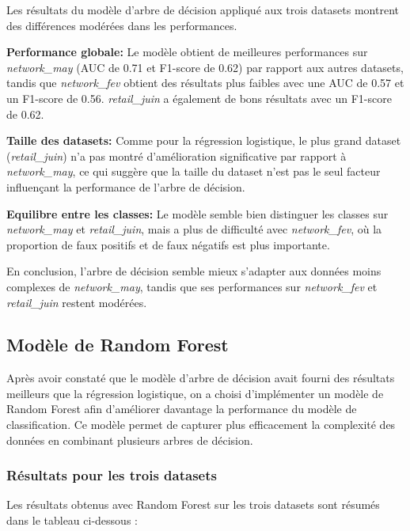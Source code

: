 Les résultats du modèle d'arbre de décision appliqué aux trois datasets montrent des différences modérées dans les performances.

\textbf{Performance globale:} Le modèle obtient de meilleures performances sur \textit{network\_may} (AUC de 0.71 et F1-score de 0.62) par rapport aux autres datasets, tandis que \textit{network\_fev} obtient des résultats plus faibles avec une AUC de 0.57 et un F1-score de 0.56. \textit{retail\_juin} a également de bons résultats avec un F1-score de 0.62.

\textbf{Taille des datasets:} Comme pour la régression logistique, le plus grand dataset (\textit{retail\_juin}) n'a pas montré d'amélioration significative par rapport à \textit{network\_may}, ce qui suggère que la taille du dataset n'est pas le seul facteur influençant la performance de l'arbre de décision.

\textbf{Equilibre entre les classes:} Le modèle semble bien distinguer les classes sur \textit{network\_may} et \textit{retail\_juin}, mais a plus de difficulté avec \textit{network\_fev}, où la proportion de faux positifs et de faux négatifs est plus importante.

En conclusion, l'arbre de décision semble mieux s'adapter aux données moins complexes de \textit{network\_may}, tandis que ses performances sur \textit{network\_fev} et \textit{retail\_juin} restent modérées.

\subsection{Modèle de Random Forest}

Après avoir constaté que le modèle d’arbre de décision avait fourni des résultats meilleurs que la régression logistique, on a choisi d’implémenter un modèle de Random Forest afin d’améliorer davantage la performance du modèle de classification. Ce modèle permet de capturer plus efficacement la complexité des données en combinant plusieurs arbres de décision.

\subsubsection{Résultats pour les trois datasets}

Les résultats obtenus avec Random Forest sur les trois datasets sont résumés dans le tableau ci-dessous :

